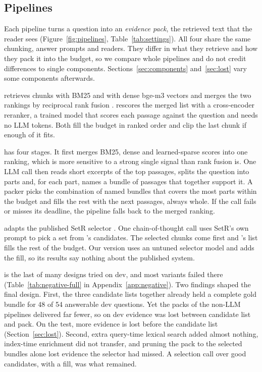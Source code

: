 \subsection{Pipelines}
\label{sec:systems}
Each pipeline turns a question into an \emph{evidence pack}, the retrieved text that the reader sees (Figure~\ref{fig:pipelines}, Table~\ref{tab:settings}). All four share the same chunking, answer prompts and readers. They differ in what they retrieve and how they pack it into the budget, so we compare whole pipelines and do not credit differences to single components. Sections~\ref{sec:components} and~\ref{sec:lost} vary some components afterwards.



\hybrid{} retrieves chunks with BM25 and with dense bge-m3 vectors \citep{chen2024bgem3} and merges the two rankings by reciprocal rank fusion \citep{cormack2009rrf}. \hr{} rescores the merged list with a cross-encoder reranker, a trained model that scores each passage against the question and needs no LLM tokens. Both fill the budget in ranked order and clip the last chunk if enough of it fits.

\lexb{} has four stages. It first merges BM25, dense and learned-sparse scores into one ranking, which is more sensitive to a strong single signal than rank fusion is. One LLM call then reads short excerpts of the top passages, splits the question into parts and, for each part, names a bundle of passages that together support it. A packer picks the combination of named bundles that covers the most parts within the budget and fills the rest with the next passages, always whole. If the call fails or misses its deadline, the pipeline falls back to the merged ranking.

\setr{} adapts the published SetR selector \citep{lee2025setr}. One chain-of-thought call uses SetR's own prompt to pick a set from \hybrid's candidates. The selected chunks come first and \hybrid's list fills the rest of the budget. Our version uses an untuned selector model and adds the fill, so its results say nothing about the published system.

\label{sec:negative}
\lexb{} is the last of many designs tried on dev, and most variants failed there (Table~\ref{tab:negative-full} in Appendix~\ref{app:negative}). Two findings shaped the final design. First, the three candidate lists together already held a complete gold bundle for 48 of 54 answerable dev questions. Yet the packs of the non-LLM pipelines delivered far fewer, so on dev evidence was lost between candidate list and pack. On the test, more evidence is lost before the candidate list (Section~\ref{sec:lost}). Second, extra query-time lexical search added almost nothing, index-time enrichment did not transfer, and pruning the pack to the selected bundles alone lost evidence the selector had missed. A selection call over good candidates, with a fill, was what remained.

